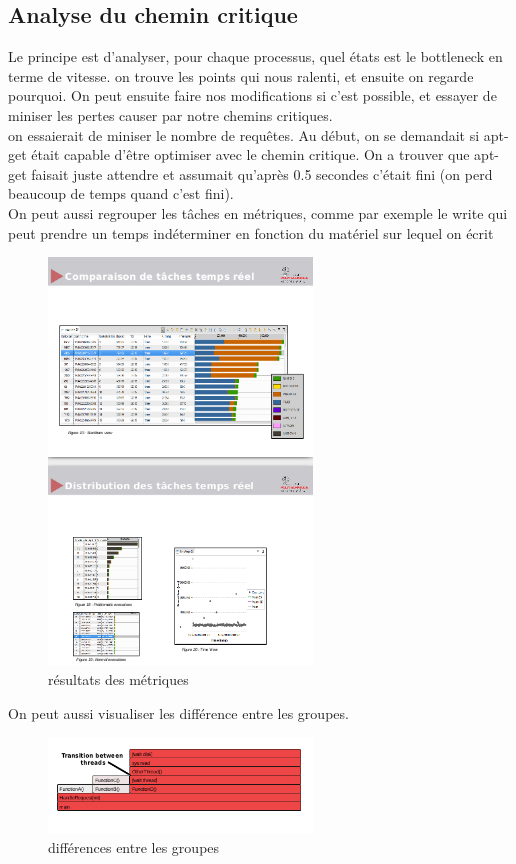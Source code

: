 \documentclass[oneside]{book}
\begin{document}
\subsection{Analyse du chemin critique}
Le principe est d'analyser, pour chaque processus, quel états est le bottleneck en terme de vitesse. on trouve les points qui nous ralenti, et ensuite on regarde pourquoi. On peut ensuite faire nos modifications si c'est possible, et essayer de miniser les pertes causer par notre chemins critiques.\\

on essaierait de miniser le nombre de requêtes. Au début, on se demandait si apt-get était capable d'être optimiser avec le chemin critique. On a trouver que apt-get faisait juste attendre et assumait qu'après 0.5 secondes c'était fini (on perd beaucoup de temps quand c'est fini).\\

On peut aussi regrouper les tâches en métriques, comme par exemple le write qui peut prendre un temps indéterminer en fonction du matériel sur lequel on écrit\\

\begin{figure}[!ht]
\centering
\includegraphics[width = 7cm]{59-60.png}
\caption{résultats des métriques}
\end{figure}
On peut aussi visualiser les différence entre les groupes. \\

\begin{figure}[!ht]
\centering
\includegraphics[width = 7cm]{62.png}
\caption{différences entre les groupes}
\end{figure}
\end{document}
